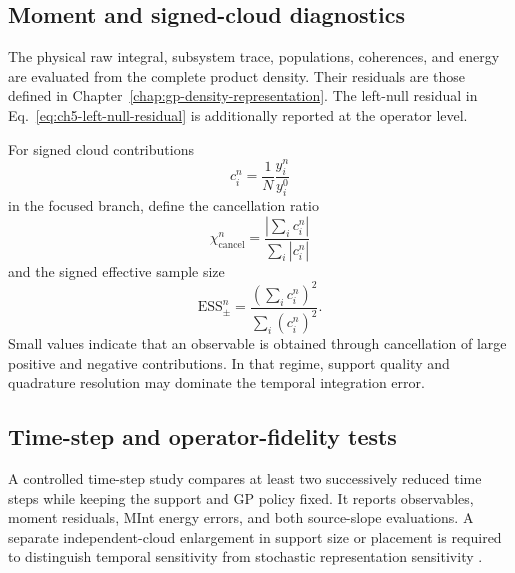 \documentclass[
  11pt,
  letterpaper,
  onehalfspacing,
  normalmargins,
  equalmargins,
  oneside
]{ut-thesis}
\begin{document}
\subsection{Moment and signed-cloud diagnostics}
\label{subsec:ch5-moment-diagnostics}

The physical raw integral, subsystem trace, populations, coherences, and
energy are evaluated from the complete product density. Their residuals are
those defined in Chapter~\ref{chap:gp-density-representation}. The
left-null residual in Eq.~\eqref{eq:ch5-left-null-residual} is additionally
reported at the operator level.

For signed cloud contributions
\begin{equation}
 c_i^n
=
\frac{1}{N}\frac{y_i^n}{y_i^0}
\label{eq:ch5-signed-contributions}
\end{equation}
in the focused branch, define the cancellation ratio
\begin{equation}
\chi_{\mathrm{cancel}}^n
=
\frac{
\left|\sum_ic_i^n\right|
}{
\sum_i|c_i^n|
}
\label{eq:ch5-cancellation-ratio}
\end{equation}
and the signed effective sample size
\begin{equation}
\mathrm{ESS}_{\pm}^n
=
\frac{
\left(\sum_ic_i^n\right)^2
}{
\sum_i(c_i^n)^2
}.
\label{eq:ch5-signed-ess}
\end{equation}
Small values indicate that an observable is obtained through cancellation of
large positive and negative contributions. In that regime, support quality
and quadrature resolution may dominate the temporal integration error.


\subsection{Time-step and operator-fidelity tests}
\label{subsec:ch5-time-step-tests}

A controlled time-step study compares at least two successively reduced
time steps while keeping the support and GP policy fixed. It reports
observables, moment residuals, MInt energy errors, and both source-slope
evaluations. A separate independent-cloud enlargement in support size or
placement is required to distinguish temporal sensitivity from stochastic
representation sensitivity \cite{Roy2005Verification,RoyOberkampf2011}.
\end{document}
